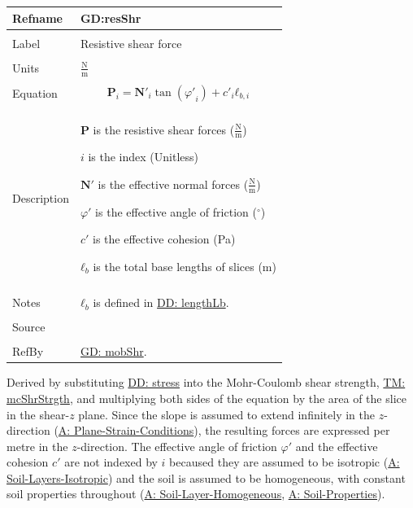 \documentclass[12pt]{article}
\begin{document}
\noindent \begin{minipage}{\textwidth}
\begin{tabular}{p{} p{}}
\toprule \textbf{Refname} & \textbf{GD:resShr}
\label{GD:resShr}
\\ \midrule \\
Label & Resistive shear force
\\ \midrule \\
Units & $\frac{\text{N}}{\text{m}}$
\\ \midrule \\
Equation & \begin{displaymath}
           {\mathbf{P}}_{i}={\mathbf{N'}}_{i} \tan\left({φ'}_{i}\right)+{c'}_{i} {\mathbf{ℓ}_{b,i}}
           \end{displaymath}
\\ \midrule \\
Description & \begin{symbDescription}
              \item{$\mathbf{P}$ is the resistive shear forces ($\frac{\text{N}}{\text{m}}$)}
              \item{$i$ is the index (Unitless)}
              \item{$\mathbf{N'}$ is the effective normal forces ($\frac{\text{N}}{\text{m}}$)}
              \item{$φ'$ is the effective angle of friction (${}^{\circ}$)}
              \item{$c'$ is the effective cohesion (Pa)}
              \item{${\mathbf{ℓ}_{b}}$ is the total base lengths of slices (m)}
              \end{symbDescription}
\\ \midrule \\
Notes & ${\mathbf{ℓ}_{b}}$ is defined in \hyperref[DD:lengthLb]{DD: lengthLb}.
\\ \midrule \\
Source & \cite{chen2005}
\\ \midrule \\
RefBy & \hyperref[GD:mobShr]{GD: mobShr}.
\\ \bottomrule \end{tabular}
\end{minipage}
Derived by substituting \hyperref[DD:stress]{DD: stress} into the Mohr-Coulomb shear strength, \hyperref[TM:mcShrStrgth]{TM: mcShrStrgth}, and multiplying both sides of the equation by the area of the slice in the shear-$z$ plane. Since the slope is assumed to extend infinitely in the $z$-direction (\hyperref[assumpPSC]{A: Plane-Strain-Conditions}), the resulting forces are expressed per metre in the $z$-direction. The effective angle of friction $φ'$ and the effective cohesion $c'$ are not indexed by $i$ becaused they are assumed to be isotropic (\hyperref[assumpSLI]{A: Soil-Layers-Isotropic}) and the soil is assumed to be homogeneous, with constant soil properties throughout (\hyperref[assumpSLH]{A: Soil-Layer-Homogeneous}, \hyperref[assumpSP]{A: Soil-Properties}).
\par~
\end{document}
